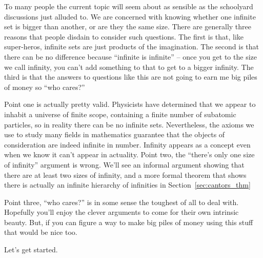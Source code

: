 To many people the current topic will seem about as sensible as the schoolyard
discussions just alluded to.  We are concerned with knowing whether
one infinite set is bigger than another, or are they the same size.  There are
generally three reasons that people disdain to consider such questions.  The
first is that, like super-heros, infinite sets are just products of the imagination.
The second is that there can be no difference because ``infinite is infinite'' -- 
once you get to the size we call infinity, you can't add something to that to
get to a bigger infinity.  The third is that the answers to questions like this
are not going to earn me big piles of money so ``who cares?''

Point one is actually pretty valid.  Physicists have determined that we
appear to inhabit a universe of finite scope, containing a finite number of
subatomic particles, so in reality there can be no infinite sets.  Nevertheless,
the axioms we use to study many fields in mathematics guarantee that the
objects of consideration are indeed infinite in number.  Infinity appears as a
concept even when we know it can't appear in actuality.
Point two, the ``there's only one size of infinity'' argument is wrong.  We'll
see an informal argument showing that there are at least two sizes of infinity,
and a more formal theorem that shows there is actually an infinite hierarchy
of infinities in Section~\ref{sec:cantors_thm}

Point three, ``who cares?'' is in some sense the toughest of all to deal with.
Hopefully you'll enjoy the clever arguments to come for their own intrinsic
beauty.  But, if you can figure a way to make big piles of money using this
stuff that would be nice too.

Let's get started.

